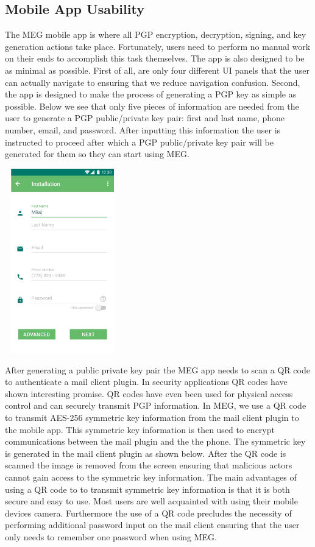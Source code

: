 \documentclass[10pt]{article}
\begin{document}
\begin{multicols}{2}
\subsection{Mobile App Usability}
\par The MEG mobile app is where all PGP encryption, decryption, signing, and key generation actions take place. Fortunately, users need to perform no manual work on their ends to accomplish this task themselves. The app is also designed to be as minimal as possible. First of all, are only four different UI panels that the user can actually navigate to ensuring that we reduce navigation confusion. Second, the app is designed to make the process of generating a PGP key as simple as possible. Below we see that only five pieces of information are needed from the user to generate a PGP public/private key pair: first and last name, phone number, email, and password. After inputting this information the user is instructed to proceed after which a PGP public/private key pair will be generated for them so they can start using MEG.\\
\begin{center}
\includegraphics[height=8cm,width=5cm]{installation-page.jpg}
\label{fig:installation}
\end{center}
\par After generating a public private key pair the MEG app needs to scan a QR code to authenticate a mail client plugin. In security applications QR codes have shown interesting promise. QR codes have even been used for physical access control \cite{qrcode-authentication} and can securely transmit PGP information\cite{qrcode-key-distribution}. In MEG, we use a QR code to transmit AES-256 symmetric key information from the mail client plugin to the mobile app. This symmetric key information is then used to encrypt communications between the mail plugin and the the phone. The symmetric key is generated in the mail client plugin as shown below. After the QR code is scanned the image is removed from the screen ensuring that malicious actors cannot gain access to the symmetric key information. The main advantages of using a QR code to to transmit symmetric key information is that it is both secure and easy to use. Most users are well acquainted with using their mobile devices camera. Furthermore the use of a QR code precludes the necessity of performing additional password input on the mail client ensuring that the user only needs to remember one password when using MEG.

\end{multicols}
\end{document}
